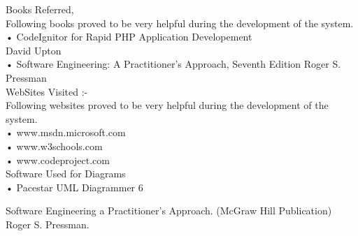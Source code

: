 \renewcommand\bibname{References}
\begin{thebibliography}{99}





 Books Referred,\\
Following books proved to be very helpful during the development of the system.\\
•	CodeIgnitor for Rapid PHP Application Developement\\
David Upton\\
•	Software Engineering: A Practitioner’s Approach, Seventh Edition
Roger S. Pressman\\
 WebSites Visited :-\\
Following websites proved to be very helpful during the development of the system.\\
•	www.msdn.microsoft.com\\
•	www.w3schools.com\\
•	www.codeproject.com\\



 Software Used for Diagrams\\
•	Pacestar UML Diagrammer 6

 Software Engineering a Practitioner’s Approach. (McGraw Hill Publication) 		Roger S. Pressman.
\end{thebibliography}